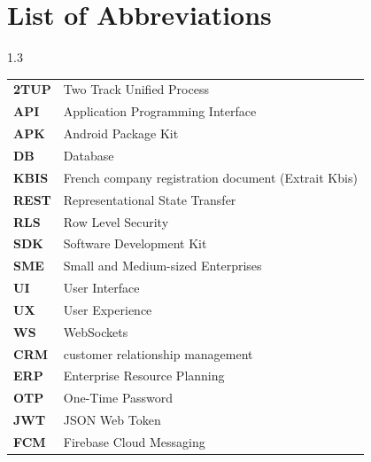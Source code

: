 \chapter*{List of Abbreviations}
\begin{spacing}{1.3}
\begin{tabular}{ll}
    \textbf{2TUP} & Two Track Unified Process \\
    \textbf{API} & Application Programming Interface \\
    \textbf{APK} & Android Package Kit \\
    \textbf{DB} & Database \\
    \textbf{KBIS} & French company registration document (Extrait Kbis) \\
    \textbf{REST} & Representational State Transfer \\
    \textbf{RLS} & Row Level Security \\
    \textbf{SDK} & Software Development Kit \\
    \textbf{SME} & Small and Medium-sized Enterprises \\
    \textbf{UI} & User Interface \\
    \textbf{UX} & User Experience \\
    \textbf{WS} & WebSockets\\
    \textbf{CRM} & customer relationship management\\
    \textbf{ERP} & Enterprise Resource Planning\\
    \textbf{OTP} & One-Time Password \\
    \textbf{JWT} & JSON Web Token \\
    \textbf{FCM} & Firebase Cloud Messaging \\
\end{tabular}
\end{spacing}
